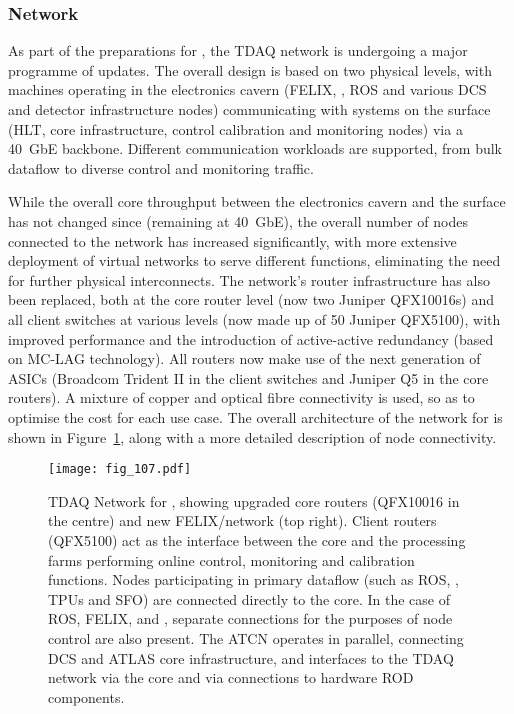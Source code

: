 \documentclass[cernpreprint, atlasdraft=false, UKenglish,british,orcidlogo, texmf, orcidlogo]{atlasdoc}
\begin{document}
\subsubsection{Network}
 
As part of the preparations for \RunThr, the \gls{TDAQ} network is undergoing a major programme of updates. The overall design is based on two physical levels, with machines operating in the electronics cavern (\gls{FELIX}, \swrod, \gls{ROS} and various \gls{DCS} and detector infrastructure nodes) communicating with systems on the surface (\gls{HLT}, core infrastructure, control calibration and monitoring nodes) via a 40~\gls{GbE} backbone. Different communication workloads are supported, from bulk dataflow to diverse control and monitoring traffic.
 
While the overall core throughput between the electronics cavern and the surface has not changed since \RunTwo (remaining at 40~\gls{GbE}), the overall number of nodes connected to the network has increased significantly, with more extensive deployment of virtual networks to serve different functions, eliminating the need for further physical interconnects. The network's router infrastructure has also been replaced, both at the core router level (now two Juniper QFX10016s) and all client switches at various levels (now made up of 50 Juniper QFX5100), with improved performance and the introduction of active-active redundancy (based on MC-LAG technology). All routers now make use of the next generation of \glspl{ASIC} (Broadcom Trident II in the client switches and Juniper Q5 in the core routers). A mixture of copper and optical fibre connectivity is used, so as to optimise the cost for each use case. The overall architecture of the network for \RunThr is shown in Figure~\ref{fig:TDAQ_DAQHLT_network}, along with a more detailed description of node connectivity.
 
 
\begin{figure}[htbp!]
\centerline{\texttt{[image: fig\_107.pdf]}}
\caption{\gls{TDAQ} Network for \RunThr, showing upgraded core routers (QFX10016 in the centre) and new \gls{FELIX}/\swrod network (top right). Client routers (QFX5100) act as the interface between the core and the processing farms performing online control, monitoring and calibration functions. Nodes participating in primary dataflow (such as \gls{ROS}, \swrod, TPUs and \gls{SFO}) are connected directly to the core. In the case of \gls{ROS}, \gls{FELIX}, and \swrod, separate connections for the purposes of node control are also present. The \gls{ATCN} operates in parallel, connecting \gls{DCS} and ATLAS core infrastructure, and interfaces to the \gls{TDAQ} network via the core and via connections to hardware \gls{ROD} components.
}
\label{fig:TDAQ_DAQHLT_network}
\end{figure}
 
\end{document}
